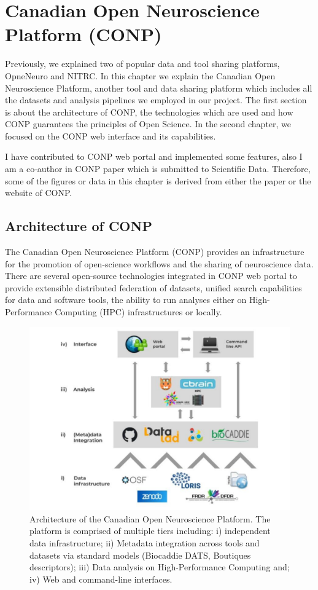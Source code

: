 \chapter{Canadian Open Neuroscience Platform (CONP)}

\label{CONP}

Previously, we explained two of popular data and tool sharing platforms, OpneNeuro and NITRC. In this chapter we explain the Canadian Open Neuroscience Platform, another tool and data sharing platform which includes all the datasets and analysis pipelines we employed in our project. The first section is about the architecture of CONP, the technologies which are used and how CONP guarantees the principles of Open Science. In the second chapter, we focused on the CONP web interface and its capabilities. 

I have contributed to CONP web portal and implemented some features, also I am a co-author in CONP paper which is submitted to Scientific Data. Therefore, some of the figures or data in this chapter is derived from either the paper or the website of CONP.

\section{Architecture of CONP}
The Canadian Open Neuroscience Platform (CONP) provides an infrastructure for the promotion of open-science workflows and the sharing of neuroscience data. There are several open-source technologies integrated in CONP web portal to provide extensible distributed federation of datasets, unified search capabilities for data and software tools, the ability to run analyses either on High-Performance Computing (HPC) infrastructures or locally.


\begin{figure}
    \centering
    \includegraphics[width=\textwidth]{figures/CONP_figure.pdf}
    \caption{Architecture of the Canadian Open Neuroscience Platform. The platform is comprised of multiple tiers including:  i) independent data infrastructure; ii) Metadata integration across tools and datasets via standard models (Biocaddie DATS, Boutiques descriptors); iii) Data analysis on High-Performance Computing and; iv) Web and command-line interfaces. \cite{CONP}}
    \label{fig:CONP_figure}
\end{figure}

